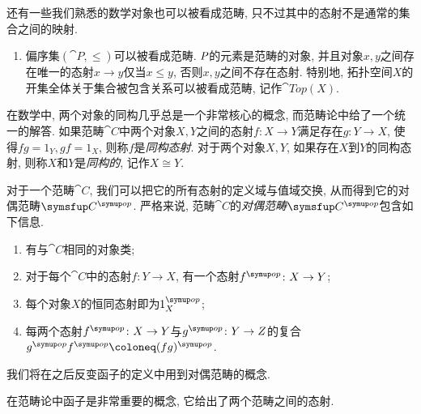 \begin{example}
  还有一些我们熟悉的数学对象也可以被看成范畴, 只不过其中的态射不是通常的集合之间的映射.
  \begin{enumerate}
    \item 偏序集$(\cat{P}, \leq)$可以被看成范畴. $\emph{P}$的元素是范畴的对象, 并且对象$x, y$之间存在唯一的态射$x\to y$仅当$x\leq y$, 否则$x, y$之间不存在态射. 特别地, 拓扑空间$X$的开集全体关于集合被包含关系可以被看成范畴, 记作$\cat{Top}(X)$.
  \end{enumerate}
\end{example}

在数学中, 两个对象的同构几乎总是一个非常核心的概念, 而范畴论中给了一个统一的解答. 如果范畴$\cat{C}$中两个对象$X, Y$之间的态射$f\colon X\to Y$满足存在$g\colon Y\to X$, 使得$fg=1_Y, gf=1_X$, 则称$f$是\emph{同构态射}. 对于两个对象$X, Y$, 如果存在$X$到$Y$的同构态射, 则称$X$和$Y$是\emph{同构的}, 记作$X\cong Y$.

对于一个范畴$\cat{C}$, 我们可以把它的所有态射的定义域与值域交换, 从而得到它的对偶范畴$\cat{C}^{\op}$. 严格来说, 范畴$\cat{C}$的\emph{对偶范畴}$\cat{C}^{\op}$包含如下信息.
\begin{enumerate}
  \item 有与$\cat{C}$相同的对象类;
  \item 对于每个$\cat{C}$中的态射$f\colon Y\to X$, 有一个态射$f^{\op}\colon X\to Y$;
  \item 每个对象$X$的恒同态射即为$1_X^{\op}$;
  \item 每两个态射$f^{\op}\colon X\to Y$与$g^{\op}\colon Y\to Z$的复合$g^{\op}f^{\op}\coloneq (fg)^{\op}$.
\end{enumerate}
我们将在之后反变函子的定义中用到对偶范畴的概念.

在范畴论中函子是非常重要的概念, 它给出了两个范畴之间的态射.

